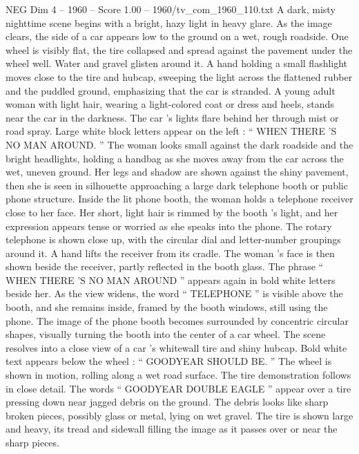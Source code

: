 \begin{textsample}{NEG Dim 4 – 1960 – Score 1.00 – 1960/tv\_com\_1960\_110.txt}  \label{ex:f4_neg_037}
A dark, misty nighttime scene begins with a bright, hazy light in heavy glare.
As the image clears, the side of a car appears low to the ground on a wet, rough roadside.
One wheel is visibly flat, the tire collapsed and spread against the pavement under the wheel well.
Water and gravel glisten around it.
A hand holding a small flashlight moves close to the tire and hubcap, sweeping the light across the flattened rubber and the puddled ground, emphasizing that the car is stranded.
A young adult woman with light hair, wearing a light-colored coat or dress and heels, stands near the car in the darkness.
The car ’s lights flare behind her through mist or road spray.
Large white block letters appear on the left : “ WHEN THERE ’S NO MAN AROUND. ” The woman looks small against the dark roadside and the bright headlights, holding a handbag as she moves away from the car across the wet, uneven ground.
Her legs and shadow are shown against the shiny pavement, then she is seen in silhouette approaching a large dark telephone booth or public phone structure.
Inside the lit phone booth, the woman holds a telephone receiver close to her face.
Her short, light hair is rimmed by the booth ’s light, and her expression appears tense or worried as she speaks into the phone.
The rotary telephone is shown close up, with the circular dial and letter-number groupings around it.
A hand lifts the receiver from its cradle.
The woman ’s face is then shown beside the receiver, partly reflected in the booth glass.
The phrase “ WHEN THERE ’S NO MAN AROUND ” appears again in bold white letters beside her.
As the view widens, the word “ TELEPHONE ” is visible above the booth, and she remains inside, framed by the booth windows, still using the phone.
The image of the phone booth becomes surrounded by concentric circular shapes, visually turning the booth into the center of a car wheel.
The scene resolves into a close view of a car ’s whitewall tire and shiny hubcap.
Bold white text appears below the wheel : “ GOODYEAR SHOULD BE. ” The wheel is shown in motion, rolling along a wet road surface.
The tire demonstration follows in close detail.
The words “ GOODYEAR DOUBLE EAGLE ” appear over a tire pressing down near jagged debris on the ground.
The debris looks like sharp broken pieces, possibly glass or metal, lying on wet gravel.
The tire is shown large and heavy, its tread and sidewall filling the image as it passes over or near the sharp pieces.

\end{textsample}
